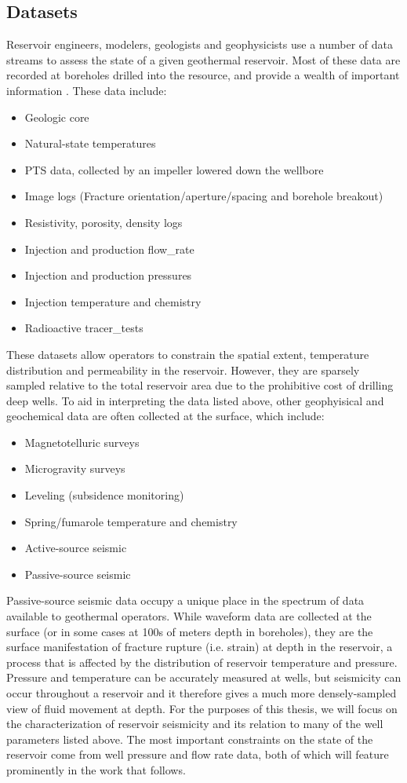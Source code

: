 \subsection{Datasets}
Reservoir engineers, modelers, geologists and geophysicists use a number of data streams to assess the state of a given geothermal reservoir. Most of these data are recorded at boreholes drilled into the resource, and provide a wealth of important information \citep{DiPippo_2016,Grant_2011}. These data include:
\begin{itemize}
  \item{Geologic core}
  \item{Natural-state temperatures}
  \item{ \acrfull{PTS} data, collected by an impeller lowered down the wellbore}
  \item{Image logs (Fracture orientation/aperture/spacing and borehole breakout)}
  \item{Resistivity, porosity, density logs}
  \item{Injection and production \gls{flow_rate}}
  \item{Injection and production pressures}
  \item{Injection temperature and chemistry}
  \item{Radioactive \glspl{tracer_test}}
\end{itemize}
These datasets allow operators to constrain the spatial extent, temperature distribution and \gls{permeability} in the reservoir. However, they are sparsely sampled relative to the total reservoir area due to the prohibitive cost of drilling deep wells. To aid in interpreting the data listed above, other geophyisical and geochemical data are often collected at the surface, which include:
\begin{itemize}
  \item{Magnetotelluric surveys}
  \item{Microgravity surveys}
  \item{Leveling (subsidence monitoring)}
  \item{Spring/fumarole temperature and chemistry}
  \item{Active-source seismic}
  \item{Passive-source seismic}
\end{itemize}

Passive-source seismic data occupy a unique place in the spectrum of data available to geothermal operators. While waveform data are collected at the surface (or in some cases at 100s of meters depth in boreholes), they are the surface manifestation of fracture rupture (i.e. strain) at depth in the reservoir, a process that is affected by the distribution of reservoir temperature and pressure. Pressure and temperature can be accurately measured at wells, but seismicity can occur throughout a reservoir and it therefore gives a much more densely-sampled view of fluid movement at depth. For the purposes of this thesis, we will focus on the characterization of reservoir seismicity and its relation to many of the well parameters listed above. The most important constraints on the state of the reservoir come from well pressure and flow rate data, both of which will feature prominently in the work that follows. 

